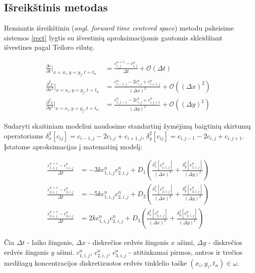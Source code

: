 \subsection{Išreikštinis metodas}

Remiantis išreikštiniu (\textit{angl. forward time centered space}) metodu pakeisime sistemos \eqref{rect} lygtis su išvestinių aproksimacijomis gautomis skleidžiant išvestines pagal Teiloro eilutę.

\begin{subequations} \label{finite-diffs}
\begin{align}
	\frac{\partial c}{\partial t}\Big|_{x=x_i, y=y_j, t=t_n}
	&=\frac{c^{n+1}_{i,j}-c^n_{i,j}}{\Delta t} 
	+ \mathcal{O}(\Delta t)\\
	\frac{\partial^2c}{\partial x^2}\Big|_{x=x_i, y=y_j, t=t_n}
	&=\frac{c^n_{i-1,j} - 2c^n_{i,j} + c^n_{i+1,j}}{(\Delta x)^2} 
	+ \mathcal{O}((\Delta x)^2)\\
	\frac{\partial^2c}{\partial y^2}\Big|_{x=x_i, y=y_j, t=t_n}
	&=\frac{c^n_{i,j-1} - 2c^n_{i,j} + c^n_{i,j+1}}{(\Delta y)^2} 
	+ \mathcal{O}((\Delta y)^2)
\end{align}
\end{subequations}

Sudaryti skaitiniam modeliui naudosime standartinį žymėjimą baigtinių skirtumų operatoriams $\delta_x^2[c_{ij}]=c_{i-1,j}-2c_{i,j}+c_{i+1,j}$, $\delta_y^2[c_{ij}]=c_{i,j-1}-2c_{i,j}+c_{i,j+1}$. Įstatome aproksimacijas į matematinį modelį:

\begin{subequations} \label{numerical-eqs}
	\begin{align}
		\frac{c^{n+1}_{1,i,j}-c^n_{1,i,j}}{\Delta t} &=
		-3kc^{n}_{1,i,j}c^{n}_{2,i,j}
		+D_1\left(\frac{\delta_x^2[c^n_{1,i,j}]}{(\Delta x)^2}+\frac{\delta_y^2[c^n_{1,i,j}]}{(\Delta y)^2}\right) \\
		\frac{c^{n+1}_{2,i,j}-c^n_{2,i,j}}{\Delta t} &=
		-5kc^{n}_{1,i,j}c^{n}_{2,i,j}
		+D_2\left(\frac{\delta_x^2[c^n_{2,i,j}]}{(\Delta x)^2}+\frac{\delta_y^2[c^n_{2,i,j}]}{(\Delta y)^2}\right) \\
		\frac{c^{n+1}_{3,i,j}-c^n_{3,i,j}}{\Delta t} &=
		2kc^{n}_{1,i,j}c^{n}_{2,i,j}
		+D_3\left(\frac{\delta_x^2[c^n_{3,i,j}]}{(\Delta x)^2}+\frac{\delta_y^2[c^n_{3,i,j}]}{(\Delta y)^2}\right)
	\end{align}
\end{subequations}

Čia
$\Delta t$ - laiko žingsnis,
$\Delta x$ - diskrečios erdvės žingsnis $x$ ašimi,
$\Delta y$ - diskrečios erdvės žingsnis $y$ ašimi.
$c^n_{1,i,j}$, $c^n_{2,i,j}$, $c^n_{3,i,j}$ - atitinkamai pirmos, antros ir trečios medžiagų koncentracijos diskretizuotos erdvės tinklelio taške $(x_i, y_i, t_n)\in\omega$.